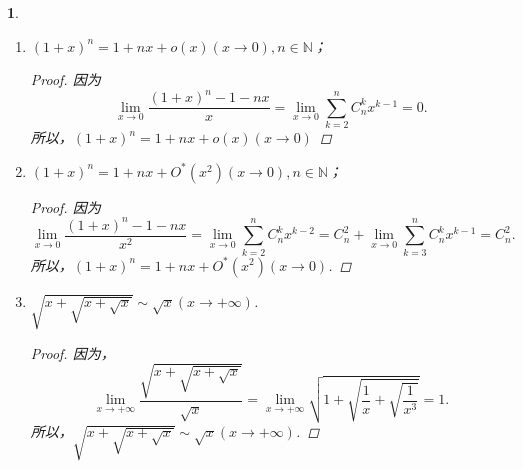 \documentclass[utf8]{book}
\newtheorem{example}{}[section]             %
\begin{document}
\begin{example}
\begin{enumerate}
\begin{proof}因为，
$$\displaystyle\lim_{x\to x_0}\frac{\displaystyle\frac{1}{1+\alpha(x)}-1+\alpha(x)}{\alpha(x)}=\displaystyle\lim_{x\to x_0}\frac{\alpha(x)}{1+\alpha(x)}=0.$$
所以，$\displaystyle\frac{1}{1+\alpha(x)}=1-\alpha(x)+o(\alpha(x))(x\to x_0)$.
\end{proof}
\item $\displaystyle(1+x)^n=1+nx+o(x)(x\to 0), n\in\mathbb{N}$；
\begin{proof}因为
$$\displaystyle\lim_{x\to 0}\frac{(1+x)^n-1-nx}{x} = \displaystyle\lim_{x\to 0}\displaystyle\sum_{k=2}^nC^k_nx^{k-1} = 0.$$
所以，$\displaystyle(1+x)^n=1+nx+o(x)(x\to 0)$
\end{proof}
\item $\displaystyle(1+x)^n=1+nx+O^*(x^2)(x\to 0), n\in\mathbb{N}$；
\begin{proof}因为
$$\displaystyle\lim_{x\to 0}\frac{(1+x)^n-1-nx}{x^2} = \displaystyle\lim_{x\to 0}\displaystyle\sum_{k=2}^nC^k_nx^{k-2} = C^2_n + \displaystyle\lim_{x\to 0}\displaystyle\sum_{k=3}^nC^k_nx^{k-1} = C^2_n.$$
所以，$\displaystyle(1+x)^n=1+nx+O^*(x^2)(x\to 0)$.
\end{proof}
\item $\sqrt{x+\sqrt{x+\sqrt{x}}}\sim \sqrt{x}(x\to +\infty)$.
\begin{proof}因为，
$$\displaystyle\lim_{x\to +\infty}\frac{\sqrt{x+\sqrt{x+\sqrt{x}}}}{\sqrt{x}}=\displaystyle\lim_{x\to +\infty}\sqrt{1+\sqrt{\frac{1}{x}+\sqrt{\frac{1}{x^3}}}}=1.$$
所以，$\sqrt{x+\sqrt{x+\sqrt{x}}}\sim \sqrt{x}(x\to +\infty)$.
\end{proof}
\end{enumerate}
\end{example}
\end{document}
